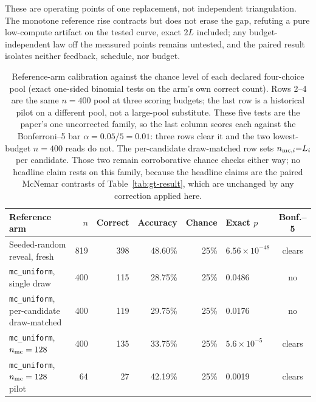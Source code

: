 \documentclass{article}
\newcommand{\mcu}{\texttt{mc\_uniform}}
\begin{document}
These are operating points of one replacement, not independent triangulation.
The monotone reference rise contracts but does not erase the gap, refuting a
pure low-compute artifact on the tested curve, exact $2L$ included; any
budget-independent law off the measured points remains untested, and the paired
result isolates neither feedback, schedule, nor budget.

\begin{table}[t]
\centering
\footnotesize
\setlength{\tabcolsep}{3.0pt}
\caption{Reference-arm calibration against the chance level of each declared
four-choice pool (exact one-sided binomial tests on the arm's own correct
count).  Rows 2--4 are the same $n=400$ pool at three scoring budgets; the last
row is a historical pilot on a different pool, not a large-pool substitute.
These five tests are the paper's one uncorrected family, so the last column
scores each against the Bonferroni--5 bar $\alpha=0.05/5=0.01$: three rows clear
it and the two lowest-budget $n{=}400$ reads do not.  The per-candidate
draw-matched row sets $n_{{\rm mc},i}{=}L_i$ per candidate.  Those two remain
corroborative chance checks either way; no headline claim rests on this family,
because the headline claims are the paired McNemar contrasts of
Table~\ref{tab:gt-result}, which are unchanged by any correction applied here.}
\label{tab:reference-calibration}
\begin{tabular}{@{}lrrrrlc@{}}
\toprule
Reference arm & $n$ & Correct & Accuracy & Chance & Exact $p$ & Bonf.--5 \\
\midrule
Seeded-random reveal, fresh & 819 & 398 & 48.60\% & 25\% & $6.56\!\times\!10^{-48}$ & clears \\
\mcu{}, single draw & 400 & 115 & 28.75\% & 25\% & 0.0486 & no \\
\mcu{}, per-candidate draw-matched & 400 & 119 & 29.75\% & 25\% & 0.0176 & no \\
\mcu{}, $n_{\rm mc}=128$ & 400 & 135 & 33.75\% & 25\% & $5.6\!\times\!10^{-5}$ & clears \\
\mcu{}, $n_{\rm mc}=128$ pilot & 64 & 27 & 42.19\% & 25\% & 0.0019 & clears \\
\bottomrule
\end{tabular}
\end{table}
\end{document}
